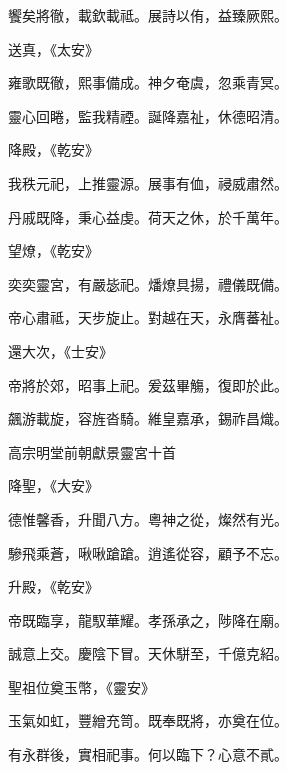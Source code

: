 \begin{pinyinscope}
 饗矣將徹，載欽載祗。展詩以侑，益臻厥熙。



 送真，《太安》



 雍歌既徹，熙事備成。神夕奄虞，忽乘青冥。



 靈心回睠，監我精禋。誕降嘉祉，休德昭清。



 降殿，《乾安》



 我秩元祀，上推靈源。展事有侐，祲威肅然。



 丹戚既降，秉心益虔。荷天之休，於千萬年。



 望燎，《乾安》



 奕奕靈宮，有嚴毖祀。燔燎具揚，禮儀既備。



 帝心肅祗，天步旋止。對越在天，永膺蕃祉。



 還大次，《士安》



 帝將於郊，昭事上祀。爰茲畢觴，復即於此。



 飆游載旋，容旌沓騎。維皇嘉承，錫祚昌熾。



 高宗明堂前朝獻景靈宮十首



 降聖，《大安》



 德惟馨香，升聞八方。粵神之從，燦然有光。



 驂飛乘蒼，啾啾蹌蹌。逍遙從容，顧予不忘。



 升殿，《乾安》



 帝既臨享，龍馭華耀。孝孫承之，陟降在廟。



 誠意上交。慶陰下冒。天休駢至，千億克紹。



 聖祖位奠玉幣，《靈安》



 玉氣如虹，豐繒充笥。既奉既將，亦奠在位。



 有永群後，實相祀事。何以臨下？心意不貳。




\end{pinyinscope}
